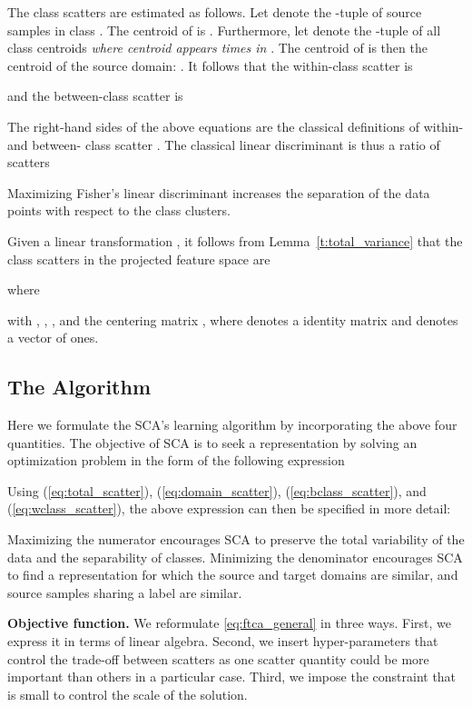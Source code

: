 \documentclass[10pt,journal,compsoc]{IEEEtran}
\begin{document}
The class scatters are estimated as follows. Let  denote the -tuple of source samples in class . The centroid of  is . Furthermore, let  denote the -tuple of all class centroids \emph{where centroid  appears  times in }. The centroid of  is then the centroid of the source domain: . It follows that the within-class scatter is

 and the between-class scatter is

The right-hand sides of the above equations are the classical definitions of within- and between- class scatter \cite{Fisher1936}. The classical linear discriminant is thus a ratio of scatters

Maximizing Fisher's linear discriminant increases the separation of the data points with respect to the class clusters.

Given a linear transformation , it follows from Lemma~\ref{t:total_variance} that the class scatters in the projected feature space  are 

where

with 
, 
,
, and 
the centering matrix , where
 denotes a  identity matrix and  denotes a vector of ones.


\subsection{The Algorithm}
Here we formulate the SCA's learning algorithm by incorporating the above four quantities.
The objective of SCA is to seek a representation by solving an optimization problem in the form of the following expression


Using (\ref{eq:total_scatter}), (\ref{eq:domain_scatter}), (\ref{eq:bclass_scatter}), and (\ref{eq:wclass_scatter}),
the above expression can then be specified in more detail:

Maximizing the numerator encourages SCA to preserve the total variability of the data and the separability of classes. Minimizing the denominator encourages SCA to find a representation for which the source and target domains are similar, and source samples sharing a label are similar.

\textbf{Objective function.}
We reformulate \eqref{eq:ftca_general} in three ways. 
First, we express it in terms of linear algebra. 
Second, we insert hyper-parameters that control the trade-off between scatters as one scatter quantity could be more important than others in a particular case.
Third, we impose the constraint that  is small to control the scale of the solution.
\end{document}
